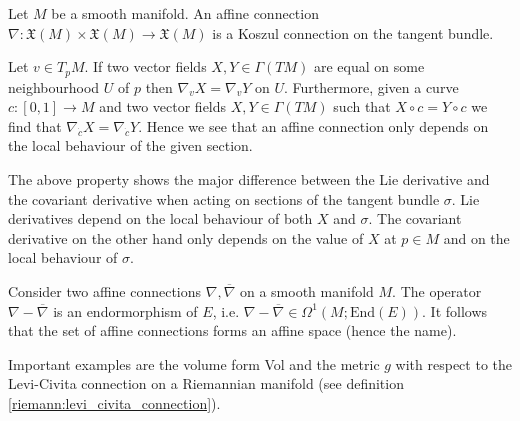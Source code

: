 	\begin{example}
		Let $M$ be a smooth manifold. An affine connection $\nabla:\mathfrak{X}(M)\times\mathfrak{X}(M)\rightarrow \mathfrak{X}(M)$ is a Koszul connection on the tangent bundle.
	\end{example}
	
	\begin{property}
		Let $v\in T_pM$. If two vector fields $X, Y\in \Gamma(TM)$ are equal on some neighbourhood $U$ of $p$ then $\nabla_vX = \nabla_vY$ on $U$. Furthermore, given a curve $c:[0, 1]\rightarrow M$ and two vector fields $X, Y\in\Gamma(TM)$ such that $X\circ c = Y\circ c$ we find that $\nabla_{\dot c}X = \nabla_{\dot c}Y$. Hence we see that an affine connection only depends on the local behaviour of the given section.
	\end{property}
	\begin{remark}
		The above property shows the major difference between the Lie derivative and the covariant derivative when acting on sections of the tangent bundle $\sigma$. Lie derivatives depend on the local behaviour of both $X$ and $\sigma$. The covariant derivative on the other hand only depends on the value of $X$ at $p\in M$ and on the local behaviour of $\sigma$. 
	\end{remark}
	
	\begin{property}[Affinity]
		Consider two affine connections $\nabla, \overline\nabla$ on a smooth manifold $M$. The operator $\nabla-\overline\nabla$ is an endormorphism of $E$, i.e. $\nabla-\overline\nabla\in\Omega^1(M;\text{End}(E))$. It follows that the set of affine connections forms an affine space (hence the name).
	\end{property}
	
	\begin{example}
		Important examples are the volume form Vol and the metric $g$ with respect to the Levi-Civita connection on a Riemannian manifold (see definition \ref{riemann:levi_civita_connection}). 
	\end{example}
	

